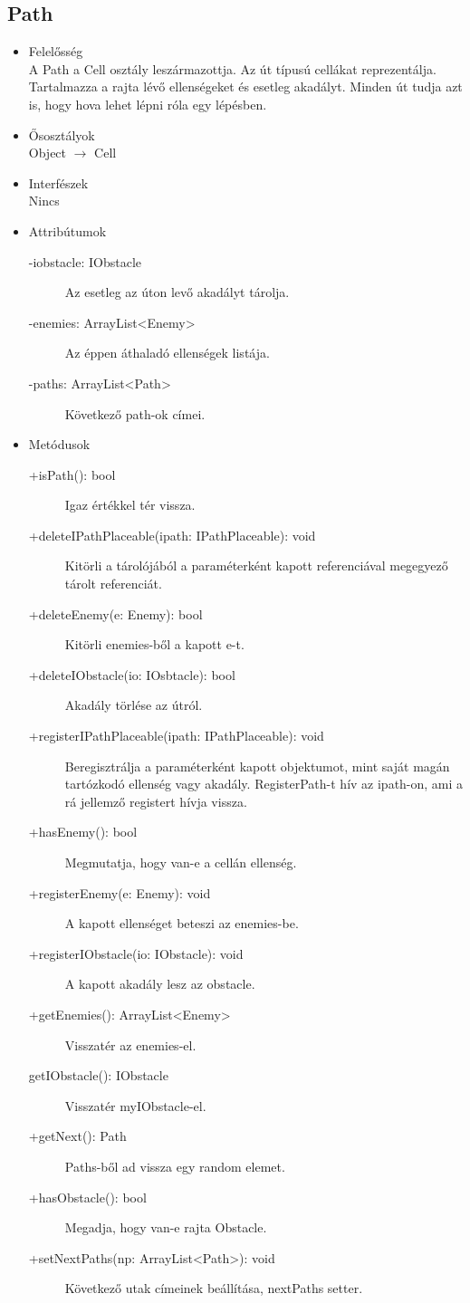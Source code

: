 \subsection{Path}
\begin{itemize}
\item Felelősség\\
A Path a Cell osztály leszármazottja. Az út típusú cellákat reprezentálja. Tartalmazza a rajta lévő ellenségeket és esetleg akadályt. Minden út tudja azt is, hogy hova lehet lépni róla egy lépésben.
\item Ősosztályok\\
Object $\rightarrow$ Cell
\item Interfészek\\
Nincs
\item Attribútumok
	\begin{description}
		\item[-iobstacle: IObstacle] Az esetleg az úton levő akadályt tárolja. 
		\item[-enemies: ArrayList<Enemy>] Az éppen áthaladó ellenségek listája. 
		\item[-paths: ArrayList<Path>] Következő path-ok címei. 

		
	\end{description}
\item Metódusok
	\begin{description} 
		\item[+isPath(): bool] Igaz értékkel tér vissza. 
		\item[+deleteIPathPlaceable(ipath: IPathPlaceable): void] Kitörli a tárolójából a paraméterként kapott referenciával megegyező tárolt referenciát. 
		\item[+deleteEnemy(e: Enemy): bool] Kitörli enemies-ből a kapott e-t. 
		\item[+deleteIObstacle(io: IOsbtacle): bool] Akadály törlése az útról. 
		\item[+registerIPathPlaceable(ipath: IPathPlaceable): void] Beregisztrálja a paraméterként kapott objektumot, mint saját magán tartózkodó ellenség vagy akadály. RegisterPath-t hív az ipath-on, ami a rá jellemző registert hívja vissza. 
		\item[+hasEnemy(): bool] Megmutatja, hogy van-e a cellán ellenség. 
		\item[+registerEnemy(e: Enemy): void] A kapott ellenséget beteszi az enemies-be. 
		\item[+registerIObstacle(io: IObstacle): void] A kapott akadály lesz az obstacle. 
		\item[+getEnemies(): ArrayList<Enemy>] Visszatér az enemies-el. 
		\item[getIObstacle(): IObstacle] Visszatér myIObstacle-el.
		\item[+getNext(): Path] Paths-ből ad vissza egy random elemet. 
		\item[+hasObstacle(): bool] Megadja, hogy van-e rajta Obstacle.
		\item[+setNextPaths(np: ArrayList<Path>): void] Következő utak címeinek beállítása, nextPaths setter.
		
		
	\end{description}
\end{itemize}

